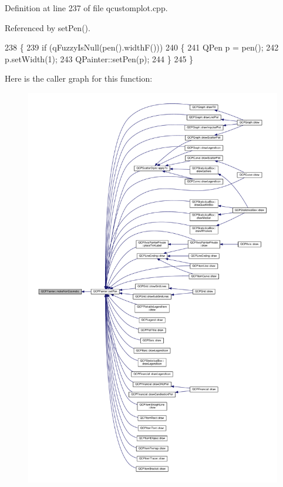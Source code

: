 Definition at line 237 of file qcustomplot.\+cpp.



Referenced by set\+Pen().


\begin{DoxyCode}
238 \{
239   \textcolor{keywordflow}{if} (qFuzzyIsNull(pen().widthF()))
240   \{
241     QPen p = pen();
242     p.setWidth(1);
243     QPainter::setPen(p);
244   \}
245 \}
\end{DoxyCode}


Here is the caller graph for this function\+:\nopagebreak
\begin{figure}[H]
\begin{center}
\leavevmode
\includegraphics[width=350pt]{class_q_c_p_painter_a7e63fbcf47e35c6f2ecd11b8fef7c7d8_icgraph}
\end{center}
\end{figure}


